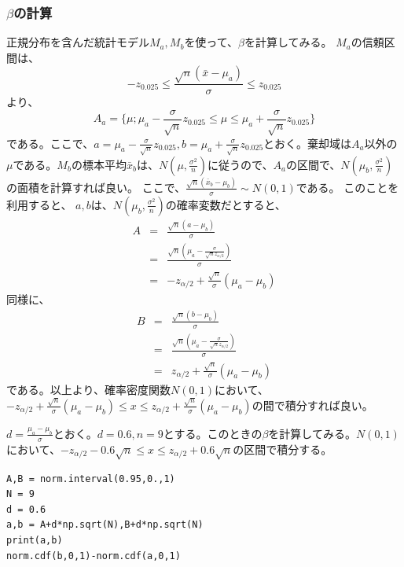 \subsubsection{$\beta$の計算}
正規分布を含んだ統計モデル$M_a,M_b$を使って、$\beta$を計算してみる。
$M_a$の信頼区間は、
\begin{equation*}
    -z_{0.025}\leq \frac{\sqrt{n}(\bar{x}-\mu_a)}{\sigma}\leq z_{0.025}
\end{equation*}
より、
\begin{equation*}
    A_a = \{ \mu ; \mu_a -\frac{\sigma}{\sqrt{n}}z_{0.025} \leq \mu \leq \mu_a +\frac{\sigma}{\sqrt{n}}z_{0.025} \}
\end{equation*}
である。ここで、$a=\mu_a -\frac{\sigma}{\sqrt{n}}z_{0.025},b = \mu_a +\frac{\sigma}{\sqrt{n}}z_{0.025} $とおく。棄却域は$A_a$以外の$\mu$である。$M_b$の標本平均$\bar{x}_b$は、$N(\mu,\frac{\sigma^2}{n})$に従うので、$A_a$の区間で、$N(\mu_b,\frac{\sigma^2}{n})$の面積を計算すれば良い。
ここで、$\frac{\sqrt{n}(\bar{x}_b-\mu_b)}{\sigma}\sim N(0,1)$である。
このことを利用すると、
$a,b$は、$N(\mu_b,\frac{\sigma^2}{n})$の確率変数だとすると、
\begin{eqnarray*}
    A &=& \frac{\sqrt{n}(a-\mu_b)}{\sigma} \\
    &=& \frac{\sqrt{n}(\mu_a-\frac{\sigma}{\sqrt{n} z_{\alpha/2}})}{\sigma}\\
    &=& -z_{\alpha/2}+\frac{\sqrt{n}}{\sigma}(\mu_a-\mu_b)
\end{eqnarray*}
同様に、
\begin{eqnarray*}
    B &=& \frac{\sqrt{n}(b-\mu_b)}{\sigma} \\
    &=& \frac{\sqrt{n}(\mu_a-\frac{\sigma}{\sqrt{n} z_{\alpha/2}})}{\sigma}\\
    &=& z_{\alpha/2}+\frac{\sqrt{n}}{\sigma}(\mu_a-\mu_b)
\end{eqnarray*}
である。以上より、確率密度関数$N(0,1)$において、$-z_{\alpha/2}+\frac{\sqrt{n}}{\sigma}(\mu_a-\mu_b) \leq x\leq  z_{\alpha/2}+\frac{\sqrt{n}}{\sigma}(\mu_a-\mu_b)$の間で積分すれば良い。

$d=\frac{\mu_a-\mu_b}{\sigma}$とおく。$d=0.6,n=9$とする。このときの$\beta$を計算してみる。$N(0,1)$において、$-z_{\alpha/2} -0.6\sqrt{n} \leq x \leq z_{\alpha/2} +0.6\sqrt{n}$の区間で積分する。

\begin{lstlisting}
A,B = norm.interval(0.95,0.,1)
N = 9
d = 0.6
a,b = A+d*np.sqrt(N),B+d*np.sqrt(N)
print(a,b)
norm.cdf(b,0,1)-norm.cdf(a,0,1)
\end{lstlisting}


